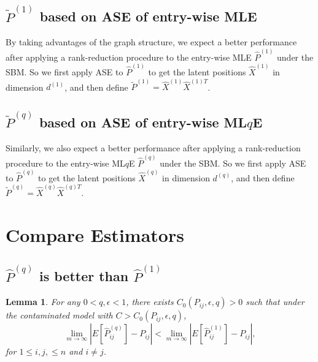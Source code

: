 \documentclass[a4paper]{article}
\newtheorem{lemma}[fact]{Lemma}
\begin{document}
\subsection{$\widetilde{P}^{(1)}$ based on ASE of entry-wise MLE}
By taking advantages of the graph structure, we expect a better performance after applying a rank-reduction procedure to the entry-wise MLE $\hat{P}^{(1)}$ under the SBM. So we first apply ASE to $\hat{P}^{(1)}$ to get the latent positions $\hat{X}^{(1)}$ in dimension $d^{(1)}$, and then define $\widetilde{P}^{(1)} = \hat{X}^{(1)} \hat{X}^{{(1)}T}$.



\subsection{$\widetilde{P}^{(q)}$ based on ASE of entry-wise ML$q$E}
Similarly, we also expect a better performance after applying a rank-reduction procedure to the entry-wise ML$q$E $\hat{P}^{(q)}$ under the SBM. So we first apply ASE to $\hat{P}^{(q)}$ to get the latent positions $\hat{X}^{(q)}$ in dimension $d^{(q)}$, and then define $\widetilde{P}^{(q)} = \hat{X}^{(q)} \hat{X}^{{(q)}T}$.








\section{Compare Estimators}

\subsection{$\hat{P}^{(q)}$ is better than $\hat{P}^{(1)}$}

\begin{lemma}
\label{lemma:ELqlEMLE}
For any $0 < q, \epsilon < 1$, there exists $C_0(P_{ij}, \epsilon, q) > 0$ such that under the contaminated model with $C > C_0(P_{ij}, \epsilon, q)$,
\[
	\lim_{m \to \infty} \left| E[\hat{P}^{(q)}_{ij}] - P_{ij} \right| < 
    \lim_{m \to \infty} \left| E[\hat{P}^{(1)}_{ij}] - P_{ij} \right|,
\]
for $1 \le i, j, \le n$ and $i \ne j$.
\end{lemma}
\end{document}
